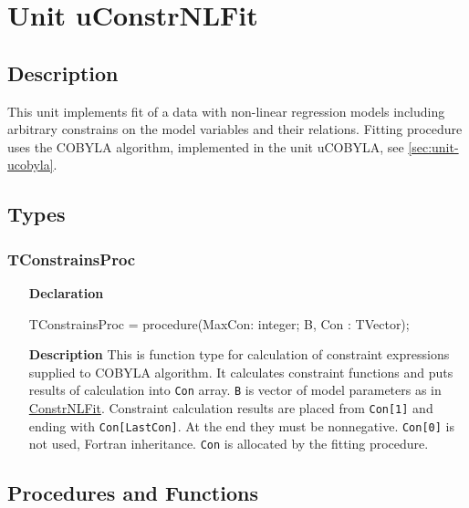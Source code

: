 \documentclass[12pt,a4paper,oneside]{report}
\newcommand{\lmatha}[1]{   %
	\marginpar{\vspace{#1} 
		\begin{flushright}
			LMath 0.5
	\end{flushright} }
}
\newcommand{\declarationitem}[1]{\textbf{#1}}
\newcommand{\descriptiontitle}[1]{\textbf{#1}}
\newcommand{\code}[1]{\texttt{#1}}
\begin{document}
\section{Unit uConstrNLFit}\label{sec:unit-uconstrnlfit}
\subsection{Description}\lmatha{-50pt}
This unit implements fit of a data with non-linear regression models including arbitrary constrains on the model variables and their relations. Fitting procedure uses the COBYLA algorithm, implemented in the unit uCOBYLA, see \ref{sec:unit-ucobyla}. 
\subsection{Types}
\subsubsection{TConstrainsProc}
\label{uconstrnlfit:tconstrainsproc}
\begin{itemize}
\item[\declarationitem{Declaration}\hfill]
\begin{flushleft}
	TConstrainsProc = procedure(MaxCon: integer; B, Con : TVector);
\end{flushleft}
\item[\descriptiontitle{Description}]
This is function type for calculation of constraint expressions supplied to COBYLA algorithm. It calculates constraint functions and puts results of calculation into \code{Con} array. \code{B} is vector of model parameters as in \hyperref[uconstrnlfit-constrnlfit]{ConstrNLFit}. Constraint calculation results are placed from \code{Con[1]} and ending with \code{Con[LastCon]}. At the end they must be nonnegative.
\code{Con[0]} is not used, Fortran inheritance. \code{Con} is allocated by the fitting procedure.
\end{itemize}
\subsection{Procedures and Functions}
\end{document}
